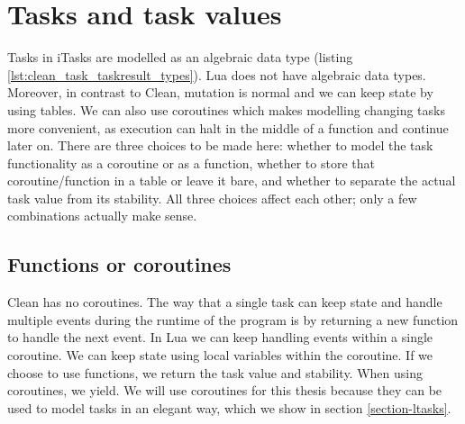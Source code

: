 \section{Tasks and task values}\label{section-task-values}
Tasks in iTasks are modelled as an algebraic data type (listing \ref{lst:clean_task_taskresult_types}). Lua does not have algebraic data types. Moreover, in contrast to Clean, mutation is normal and we can keep state by using tables. We can also use coroutines which makes modelling changing tasks more convenient, as execution can halt in the middle of a function and continue later on. There are three choices to be made here: whether to model the task functionality as a coroutine or as a function, whether to store that coroutine/function in a table or leave it bare, and whether to separate the actual task value from its stability. All three choices affect each other; only a few combinations actually make sense.

\subsection{Functions or coroutines}\label{section-task-values-fn-coroutine}
Clean has no coroutines. The way that a single task can keep state and handle multiple events during the runtime of the program is by returning a new function to handle the next event. In Lua we can keep handling events within a single coroutine. We can keep state using local variables within the coroutine. If we choose to use functions, we return the task value and stability. When using coroutines, we yield. We will use coroutines for this thesis because they can be used to model tasks in an elegant way, which we show in section \ref{section-ltasks}.

